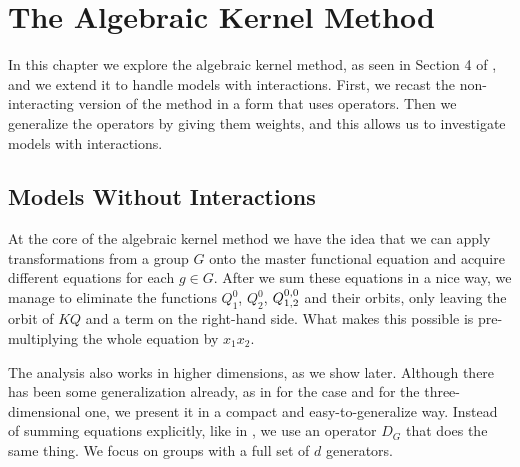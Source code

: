 
\chapter{The Algebraic Kernel Method}
\label{ch:AKM}

In this chapter we explore the algebraic kernel method, as seen in Section 4 of \cite[p.~9]{bostan2014three}, and we extend it to handle models with interactions. First, we recast the non-interacting version of the method in a form that uses operators. Then we generalize the operators by giving them weights, and this allows us to investigate models with interactions.

\section{Models Without Interactions}
At the core of the algebraic kernel method we have the idea that we can apply transformations from a group $G$ onto the master functional equation and acquire different equations for each $g\in  G$. After we sum these equations in a nice way, we manage to eliminate the functions $Q_1^0$, $Q_2^0$, $Q_{1,2}^{0,0}$ and their orbits, only leaving the orbit of $KQ$ and a term on the right-hand side. What makes this possible is pre-multiplying the whole equation by $x_1 x_2$. 

The analysis also works in higher dimensions, as we show later. Although there has been some generalization already, as in \cite[p.~11]{bousquet2010walks} for the \twoD case and \cite[p.~10]{bostan2014three} for the three-dimensional one, we present it in a compact and easy-to-generalize way.  Instead of summing equations explicitly, like in \cite{bousquet2010walks}, we use an operator $D_G$ that does the same thing. We focus on groups with a full set of $d$ generators.

